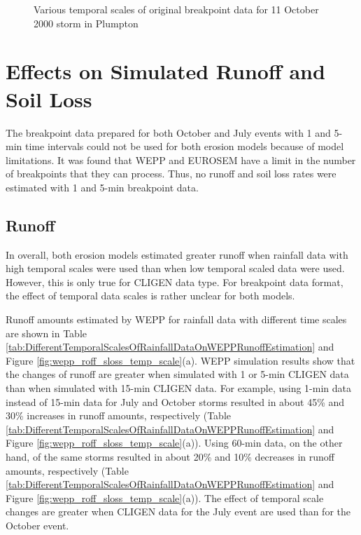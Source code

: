 \begin{figure}[htbp]
  \caption{Various temporal scales of original breakpoint data for 11 October
2000 storm in Plumpton}
  \label{fig:pl_storm}
\end{figure}

\section{Effects on Simulated Runoff and Soil Loss}
\label{sec:TemporalScalesSimulatedRunoffAndSoilLoss}

The breakpoint data prepared for both October and July events with 1 and 5-min
time intervals could not be used for both erosion models because of model
limitations. It was found that WEPP and EUROSEM have a limit in the number of
breakpoints that they can process. Thus, no runoff and soil loss rates were
estimated with 1 and 5-min breakpoint data.

\subsection{Runoff}
\label{sec:TemporalScalesSimulatedRunoff}

In overall, both erosion models estimated greater runoff when rainfall data
with high temporal scales were used than when low temporal scaled data were
used. However, this is only true for CLIGEN data type. For breakpoint data
format, the effect of temporal data scales is rather unclear for both models.

Runoff amounts estimated by WEPP for rainfall data with different time scales
are shown in Table
\ref{tab:DifferentTemporalScalesOfRainfallDataOnWEPPRunoffEstimation} and Figure
\ref{fig:wepp_roff_sloss_temp_scale}(a). WEPP simulation results show that the
changes of runoff are greater when simulated with 1 or 5-min CLIGEN data than
when simulated with 15-min CLIGEN data. For example, using 1-min data instead of
15-min data for July and October storms resulted in about 45\% and 30\%
increases in runoff amounts, respectively (Table
\ref{tab:DifferentTemporalScalesOfRainfallDataOnWEPPRunoffEstimation} and
Figure \ref{fig:wepp_roff_sloss_temp_scale}(a)). Using 60-min data, on the
other hand, of the same storms resulted in about 20\% and 10\% decreases in
runoff amounts, respectively (Table
\ref{tab:DifferentTemporalScalesOfRainfallDataOnWEPPRunoffEstimation} and
Figure \ref{fig:wepp_roff_sloss_temp_scale}(a)). The effect of temporal scale
changes are greater when CLIGEN data for the July event are used than for the
October event. 

